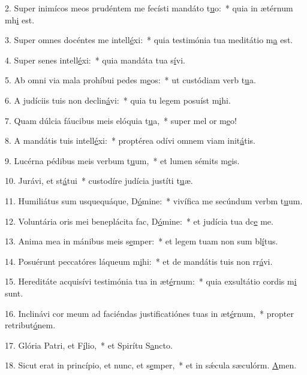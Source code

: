2. Super inimícos meos prudéntem me fecísti mandáto t\uline{u}o:~* quia in ætérnum mh\uline{i} est.\par 
3. Super omnes docéntes me intell\uline{é}xi:~* quia testimónia tua meditátio m\uline{a} est.\par 
4. Super senes intell\uline{é}xi:~* quia mandáta tua s\uline{í}vi.\par 
5. Ab omni via mala prohíbui pedes m\uline{e}os:~* ut custódiam verb t\uline{u}a.\par 
6. A judíciis tuis non declin\uline{á}vi:~* quia tu legem posuíst m\uline{i}hi.\par 
7. Quam dúlcia fáucibus meis elóquia t\uline{u}a,~* super mel or m\uline{e}o!\par 
8. A mandátis tuis intell\uline{é}xi:~* proptérea odívi omnem viam init\uline{á}tis.\par 
9. Lucérna pédibus meis verbum t\uline{u}um,~* et lumen sémits m\uline{e}is.\par 
10. Jurávi, et st\uline{á}tui~* custodíre judícia justíti t\uline{u}æ.\par 
11. Humiliátus sum usquequáque, D\uline{ó}mine:~* vivífica me secúndum verbm t\uline{u}um.\par 
12. Voluntária oris mei beneplácita fac, D\uline{ó}mine:~* et judícia tua dc\uline{e} me.\par 
13. Anima mea in mánibus meis s\uline{e}mper:~* et legem tuam non sum bl\uline{í}tus.\par 
14. Posuérunt peccatóres láqueum m\uline{i}hi:~* et de mandátis tuis non rr\uline{á}vi.\par 
15. Hereditáte acquisívi testimónia tua in æt\uline{é}rnum:~* quia exsultátio cordis m\uline{i} sunt.\par 
16. Inclinávi cor meum ad faciéndas justificatiónes tuas in æt\uline{é}rnum,~* propter retribut\uline{ó}nem.\par 
17. Glória Patri, et F\uline{í}lio,~* et Spirítu S\uline{a}ncto.\par 
18. Sicut erat in princípio, et nunc, et s\uline{e}mper,~* et in sǽcula sæculórm. \uline{A}men.\par 
